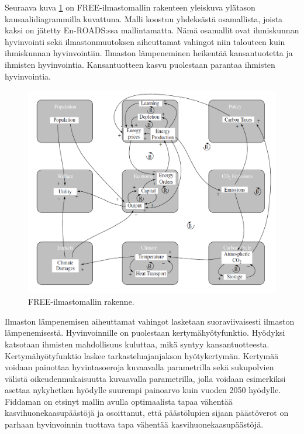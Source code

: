 \documentclass[finnish,12pt,a4paper,pdftex]{article}
\begin{document}
\begin{onehalfspacing}
Seuraava kuva \ref{ilmasto:muut:free} on FREE-ilmastomallin rakenteen yleiskuva ylätason kausaalidiagrammilla kuvattuna. Malli koostuu yhdeksästä osamallista, joista kaksi on jätetty En-ROADS:ssa mallintamatta. Nämä osamallit ovat ihmiskunnan hyvinvointi sekä ilmastonmuutoksen aiheuttamat vahingot niin talouteen kuin ihmiskunnan hyvinvointiin. Ilmaston lämpeneminen heikentää kansantuotetta ja ihmisten hyvinvointia. Kansantuotteen kasvu puolestaan parantaa ihmisten hyvinvointia. \cite{Fiddaman1997, Fiddaman2002}

\begin{figure}[ht]
\centering \includegraphics[width=\textwidth]{free}
\caption{FREE-ilmastomallin rakenne. \cite{Fiddaman2002} \label{ilmasto:muut:free}}
\end{figure}

Ilmaston lämpenemisen aiheuttamat vahingot lasketaan suoraviivaisesti ilmaston lämpenemisestä. Hyvinvoinnille on puolestaan kertymähyötyfunktio. Hyödyksi katsotaan ihmisten mahdollisuus kuluttaa, mikä syntyy kansantuotteesta. Kertymähyötyfunktio laskee tarkasteluajanjakson hyötykertymän. Kertymää voidaan painottaa hyvintasoeroja kuvaavalla parametrilla sekä sukupolvien välistä oikeudenmukaisuutta kuvaavalla parametrilla, jolla voidaan esimerkiksi asettaa nykyhetken hyödylle suurempi painoarvo kuin vuoden 2050 hyödylle. \cite{Fiddaman1997, Fiddaman2002} Fiddaman \cite{Fiddaman2002} on etsinyt mallin avulla optimaalista tapaa vähentää kasvihuonekaasupäästöjä ja osoittanut, että päästölupien sijaan päästöverot on parhaan hyvinvoinnin tuottava tapa vähentää kasvihuonekaasupäästöjä. 


\end{onehalfspacing}
\end{document}
